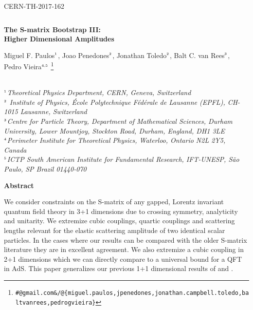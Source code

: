 \documentclass[12pt]{article}
\newcommand{\<}{{\langle}}
\renewcommand{\>}{{\rangle}}
\newcommand\blfootnote[1]{%
  \begingroup
  \renewcommand\thefootnote{}\footnote{\hspace{-6mm}#1}%
  \addtocounter{footnote}{-1}%
  \endgroup
}
\begin{document}
\thispagestyle{empty}

\renewcommand{\thefootnote}{\fnsymbol{footnote}}
\setcounter{page}{1}
\setcounter{footnote}{0}
\setcounter{figure}{0}

\begin{flushright}
CERN-TH-2017-162
\end{flushright}
\vspace{-0.4in}
\begin{center}
$$$$
{\Large\textbf{
The S-matrix Bootstrap III: \\ Higher Dimensional Amplitudes
}\par}
\vspace{1.0cm}


\textrm{Miguel F. Paulos$^\text{\tiny 1}$, Joao Penedones$^\text{\tiny 2}$, Jonathan Toledo$^\text{\tiny 2}$, Balt C. van Rees$^\text{\tiny 3}$, Pedro Vieira$^\text{\tiny 4,\tiny 5}$}
\blfootnote{\tt  \#@gmail.com\&/@\{miguel.paulos,jpenedones,jonathan.campbell.toledo,baltvanrees,pedrogvieira\}}
\\ \vspace{1.2cm}
\footnotesize{\textit{
$^\text{\tiny 1}$Theoretical Physics Department, CERN, Geneva, Switzerland\\
$^\text{\tiny 2}$
Institute of Physics, \'Ecole Polytechnique F\'ed\'erale de Lausanne (EPFL),
 CH-1015 Lausanne,
Switzerland\\
$^\text{\tiny 3}$Centre for Particle Theory, Department of Mathematical Sciences, Durham University, Lower Mountjoy, Stockton Road, Durham, England, DH1 3LE\\
$^\text{\tiny 4}$Perimeter Institute for Theoretical Physics,
Waterloo, Ontario N2L 2Y5, Canada\\
$^\text{\tiny 5}$ICTP South American Institute for Fundamental Research, IFT-UNESP, S\~ao Paulo, SP Brazil 01440-070  }  
\vspace{4mm}
}



\par\vspace{1.5cm}

\textbf{Abstract}\vspace{2mm}
\end{center}
We consider constraints on the S-matrix of any gapped, Lorentz invariant quantum field theory in 3+1 dimensions due to crossing symmetry, analyticity and unitarity. We extremize cubic couplings, quartic couplings and scattering lengths relevant for the elastic scattering amplitude of two identical scalar particles. In the cases where our results can be compared with the older S-matrix literature they are in excellent agreement. We also extremize a cubic coupling in 2+1 dimensions which we can directly compare to a universal bound for a QFT in AdS. This paper generalizes our previous 1+1 dimensional results of \cite{paperI} and \cite{paperII}.
\noindent
\end{document}
